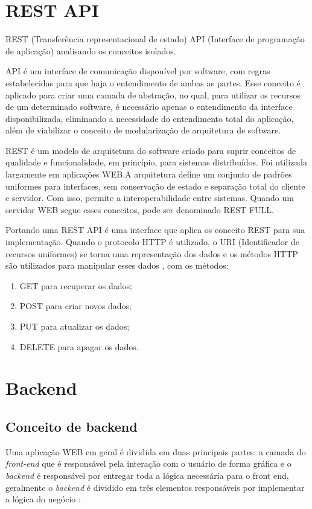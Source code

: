 \documentclass[../../layout.tex]{subfiles}
\begin{document}
\section{REST API}
\hspace*{3em}REST (Transferência representacional de estado) API (Interface de programação de aplicação) analisando os conceitos isolados.\par
API é um interface de comunicação disponível por software, com regras estabelecidas para que haja o entendimento de ambas as partes. Esse conceito é aplicado para criar uma camada de abstração, no qual, para utilizar os recursos de um determinado software, é necessário apenas o entendimento da interface disponibilizada, eliminando a  necessidade do entendimento total do aplicação, além de viabilizar o conceito de modularização de arquitetura de software. \cite{16} \par 
REST é um modelo de arquitetura do software criado para suprir conceitos de qualidade e funcionalidade, em princípio, para sistemas distribuídos. Foi utilizada largamente em aplicações WEB.A arquitetura define um conjunto de padrões uniformes para interfaces, sem conservação de estado e separação total do cliente e servidor. Com isso, permite a interoperabilidade entre sistemas. Quando um servidor WEB segue esses conceitos, pode ser denominado REST FULL.\par
Portando uma REST API é uma interface que aplica os conceito REST para sua implementação\cite{19}. Quando o protocolo HTTP é utilizado, o URI (Identificador de recursos uniformes) se torna uma representação dos dados e os métodos HTTP são utilizados para manipular esses dados \cite{16}, com os métodos:

\begin{enumerate}[label=\alph*)]
\itemsep0em
    \item GET para recuperar os dados;
    \item POST para criar novos dados;
    \item PUT para atualizar os dados;
    \item DELETE para apagar os dados.
\end{enumerate}

\section{Backend}
\subsection{Conceito de backend}
\hspace*{3em}Uma aplicação WEB em geral é dividida  em duas principais partes: a camada do \emph{front-end} que é responsável pela interação com o usuário de forma gráfica e o \emph{backend} é responsável por entregar toda a lógica necessária para o front end, geralmente o \emph{backend} é dividido em três elementos responsáveis por implementar a lógica do negócio \cite{16}:
\end{document}
